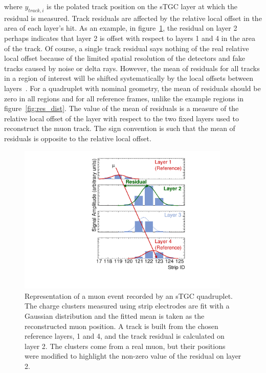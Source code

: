 where $y_{track, i}$ is the polated track position on the sTGC layer at which the residual is measured. Track residuals are affected by the relative local offset in the area of each layer's hit. As an example, in figure~\ref{fig:fake_event_display}, the residual on layer 2 perhaps indicates that layer 2 is offset with respect to layers 1 and 4 in the area of the track. Of course, a single track residual says nothing of the real relative local offset because of the limited spatial resolution of the detectors and fake tracks caused by noise or delta rays. However, the mean of residuals for all tracks in a region of interest will be shifted systematically by the local offsets between layers~\cite{lefebvre_thesis}. For a quadruplet with nominal geometry, the mean of residuals should be zero in all regions and for all reference frames, unlike the example regions in figure~\ref{fig:res_dist}. The value of the mean of residuals is a measure of the relative local offset of the layer with respect to the two fixed layers used to reconstruct the muon track. The sign convention is such that the mean of residuals is opposite to the relative local offset.

\begin{figure}
    \centering
    \includegraphics[width = 0.9\textwidth]{figures/figure_fake_event_display.pdf}
    \caption{Representation of a muon event recorded by an sTGC quadruplet. The charge clusters measured using strip electrodes are fit with a Gaussian distribution and the fitted mean is taken as the reconstructed muon position. A track is built from the chosen reference layers, 1 and 4, and the track residual is calculated on layer 2. The clusters come from a real muon, but their positions were modified to highlight the non-zero value of the residual on layer 2.}
    \label{fig:fake_event_display}
\end{figure}

